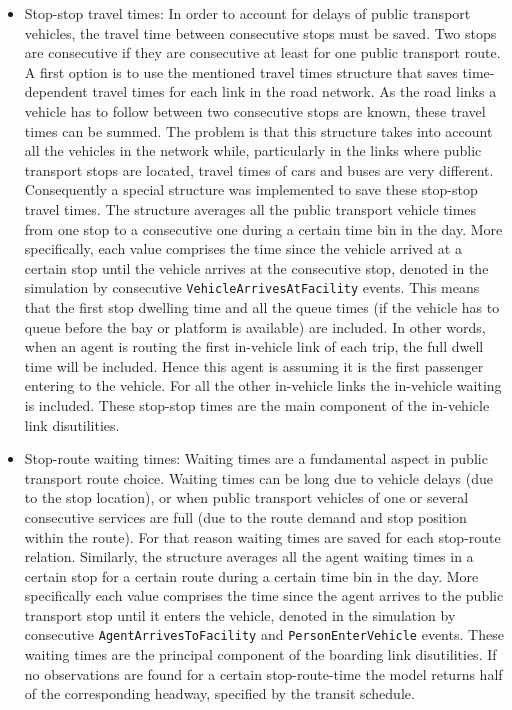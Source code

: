 \begin{itemize}\styleItemize
\item Stop-stop travel times: In order to account for delays of public transport vehicles, the travel time between consecutive stops must be saved. Two stops are consecutive if they are consecutive at least for one public transport route. A first option is to use the mentioned travel times structure that saves time-dependent travel times for each link in the road network. As the road links a vehicle has to follow between two consecutive stops are known, these travel times can be summed. The problem is that this structure takes into account all the vehicles in the network while, particularly in the links where public transport stops are located, travel times of cars and buses are very different. Consequently a special structure was implemented to save these stop-stop travel times. The structure averages all the public transport vehicle times from one stop to a consecutive one during a certain time bin in the day. More specifically, each value comprises the time since the vehicle arrived at a certain stop until the vehicle arrives at the consecutive stop, denoted in the simulation by consecutive \lstinline|VehicleArrivesAtFacility| events. This means that the first stop dwelling time and all the queue times (if the vehicle has to queue before the bay or platform is available) are included. In other words, when an agent is routing the first in-vehicle link of each trip, the full dwell time will be included. Hence this agent is assuming it is the first passenger entering to the vehicle. For all the other in-vehicle links the in-vehicle waiting is included. These stop-stop times are the main component of the in-vehicle link disutilities.
%
\item Stop-route waiting times: Waiting times are a fundamental aspect in public transport route choice. Waiting times can be long due to vehicle delays (\ie due to the stop location), or when public transport vehicles of one or several consecutive services are full (\ie due to the route demand and stop position within the route). For that reason waiting times are saved for each stop-route relation. Similarly, the structure averages all the agent waiting times in a certain stop for a certain route during a certain time bin in the day. More specifically each value comprises the time since the agent arrives to the public transport stop until it enters the vehicle, denoted in the simulation by consecutive \lstinline|AgentArrivesToFacility| and \lstinline|PersonEnterVehicle| \glspl{event}. These waiting times are the principal component of the boarding link disutilities. If no observations are found for a certain stop-route-time the model returns half of the corresponding headway, specified by the transit schedule.

\end{itemize}
